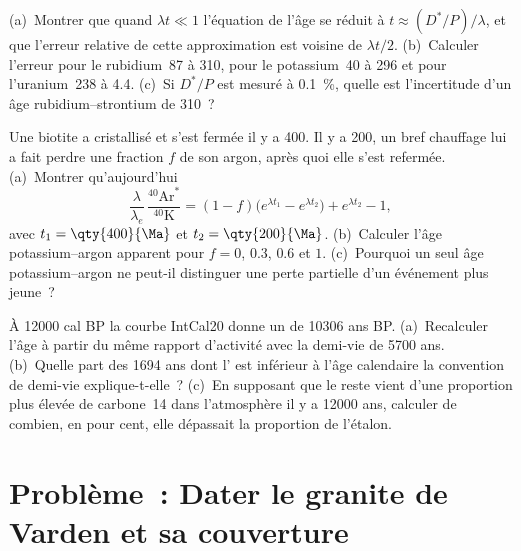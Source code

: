 \begin{exercise}[$\star\star\star$]\label{exo:b1:radiometric-methods:10}
(a)~Montrer que quand $\lambda t \ll 1$ l'équation de l'âge se réduit à $t \approx
(D^*/P)/\lambda$, et que l'erreur relative de cette approximation est voisine de
$\lambda t/2$. (b)~Calculer l'erreur pour le rubidium~87 à \qty{310}{\Ma}, pour
le potassium~40 à \qty{296}{\Ma} et pour l'uranium~238 à \qty{4.4}{\Ga}. (c)~Si
$D^*/P$ est mesuré à \qty{0.1}{\percent}, quelle est l'incertitude d'un âge
rubidium--strontium de \qty{310}{\Ma}~?
\end{exercise}

\begin{exercise}[$\star\star\star$]\label{exo:b1:radiometric-methods:11}
Une biotite a cristallisé et s'est fermée il y a \qty{400}{\Ma}. Il y a \qty{200}{\Ma}, un
bref chauffage lui a fait perdre une fraction $f$ de son argon, après quoi elle s'est refermée.
(a)~Montrer qu'aujourd'hui
\[
  \frac{\lambda}{\lambda_e}\,\frac{^{40}\mathrm{Ar}^*}{^{40}\mathrm{K}} =
  (1 - f)\bigl(e^{\lambda t_1} - e^{\lambda t_2}\bigr) + e^{\lambda t_2} - 1,
\]
avec $t_1 = \qty{400}{\Ma}$ et $t_2 = \qty{200}{\Ma}$. (b)~Calculer
l'âge potassium--argon apparent pour $f = 0$, $0.3$, $0.6$ et $1$. (c)~Pourquoi un
seul âge potassium--argon ne peut-il distinguer une perte partielle d'un événement plus jeune~?
\end{exercise}

\begin{exercise}[$\star\star\star$]\label{exo:b1:radiometric-methods:12}
À \num{12000} cal BP la courbe IntCal20 donne un  de
\num{10306} ans BP. (a)~Recalculer l'âge à partir du même rapport d'activité avec la
demi-vie de \num{5700} ans. (b)~Quelle part des \num{1694} ans dont l' est inférieur à l'âge calendaire la convention de demi-vie
explique-t-elle~? (c)~En supposant que le reste vient d'une proportion plus élevée de carbone~14 dans
l'atmosphère il y a \num{12000} ans, calculer de combien, en pour cent, elle dépassait
la proportion de l'étalon.
\end{exercise}

\section{Problème~: Dater le granite de Varden et sa couverture}

